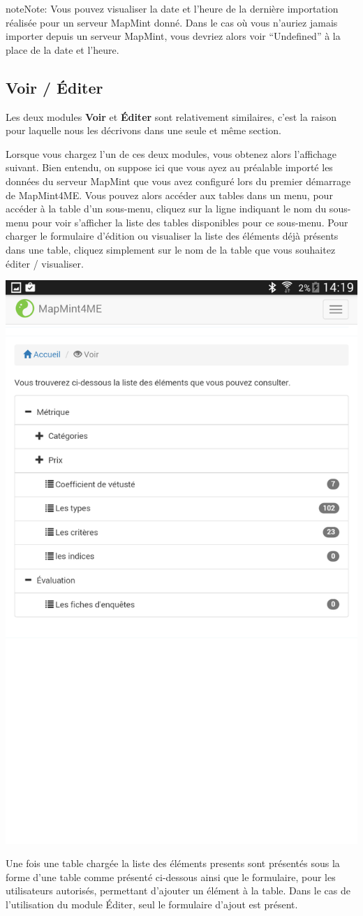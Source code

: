 \documentclass[letterpaper,10pt,english]{sphinxmanual}
\begin{document}
\begin{notice}{note}{Note:}
Vous pouvez visualiser la date et l'heure de la dernière importation réalisée pour un serveur MapMint donné. Dans le cas où vous n'auriez jamais importer depuis un serveur MapMint, vous devriez alors voir ``Undefined'' à la place de la date et l'heure.
\end{notice}


\subsection{Voir / Éditer}
\label{tables/mapmint4me:voir-editer}
Les deux modules \textbf{Voir} et \textbf{Éditer} sont relativement similaires, c'est la raison pour laquelle nous les décrivons dans une seule et même section.

Lorsque vous chargez l'un de ces deux modules, vous obtenez alors l'affichage suivant. Bien entendu, on suppose ici que vous ayez au préalable importé les données du serveur MapMint que vous avez configuré lors du premier démarrage de MapMint4ME. Vous pouvez alors accéder aux tables dans un menu, pour accéder à la table d'un sous-menu, cliquez sur la ligne indiquant le nom du sous-menu pour voir s'afficher la liste des tables disponibles pour ce sous-menu. Pour charger le formulaire d'édition ou visualiser la liste des éléments déjà présents dans une table, cliquez simplement sur le nom de la table que vous souhaitez éditer / visualiser.

{\hfill\includegraphics[width=0.450\linewidth]{mm4me-view-init.png}\hfill}

Une fois une table chargée la liste des éléments presents sont présentés sous la forme d'une table comme présenté ci-dessous ainsi que le formulaire, pour les utilisateurs autorisés, permettant d'ajouter un élément à la table. Dans le cas de l'utilisation du module Éditer, seul le formulaire d'ajout est présent.
\end{document}
